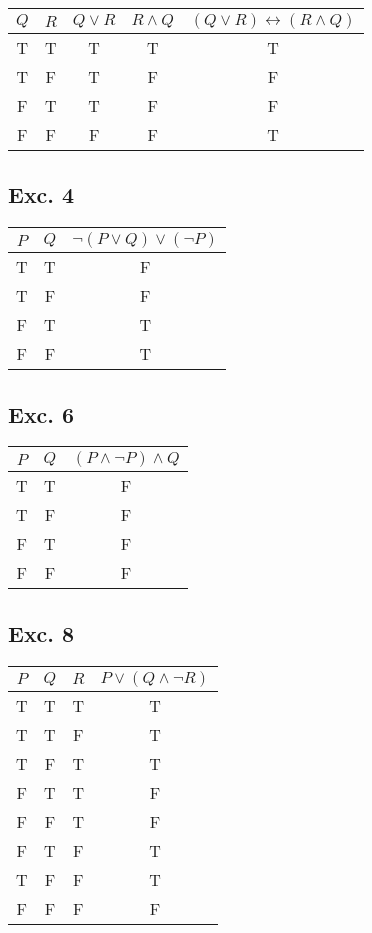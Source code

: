 \documentclass[12pt]{article}
\begin{document}
\begin{tabular}{|c|c|c|c|c|}
    \hline
	\(Q\) & \(R\) & \(Q \lor R\) & \(R \land Q\) & \((Q \lor R ) \leftrightarrow (R \land Q)\) \\
    \hline
	T & T & T & T & T\\
	T & F & T & F & F\\
	F & T & T & F & F\\
	F & F & F & F & T\\
    \hline
\end{tabular}

\subsection*{Exc. 4}

\begin{tabular}{|c|c|c|}
    \hline
	\(P\) & \(Q\) & \(\neg(P \lor Q) \lor (\neg P) \)\\
    \hline
	T & T & F\\
	T & F & F\\
	F & T & T\\
	F & F & T\\
    \hline
\end{tabular}

\subsection*{Exc. 6}

\begin{tabular}{|c|c|c|}
    \hline
	\(P\) & \(Q\) & \((P \land \neg P) \land Q \)\\
    \hline
	T & T & F\\
	T & F & F\\
	F & T & F\\
	F & F & F\\
    \hline
\end{tabular}

\subsection*{Exc. 8}

\begin{tabular}{|c|c|c|c|}
    \hline
	\(P\) & \(Q\) & \(R\) & \(P \lor (Q \land \neg R)\)\\
    \hline
	T & T & T & T\\
	T & T & F & T\\
	T & F & T & T\\
	F & T & T & F\\
	F & F & T & F\\
	F & T & F & T\\
	T & F & F & T\\
	F & F & F & F\\
    \hline
\end{tabular}
\end{document}
